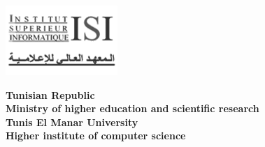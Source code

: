 


\thispagestyle{cover}%
\hspace{-47pt}
\begin{minipage}[l]{0.2\columnwidth}
\vspace{6mm}
\includegraphics[width=1.1\columnwidth]{Logo_ISI_Black}\\
\end{minipage}
\hfill
\begin{minipage}[l]{0.6\columnwidth}
\centering
\footnotesize
\textbf{{Tunisian Republic}}\\
\vspace{1.5mm}
\textbf{{Ministry of higher education and scientific
 research}}\\
\vspace{1.5mm}
\textbf{{Tunis El Manar University}}\\
\vspace{1.5mm}
\textbf{{Higher institute of computer science}}
\end{minipage}
